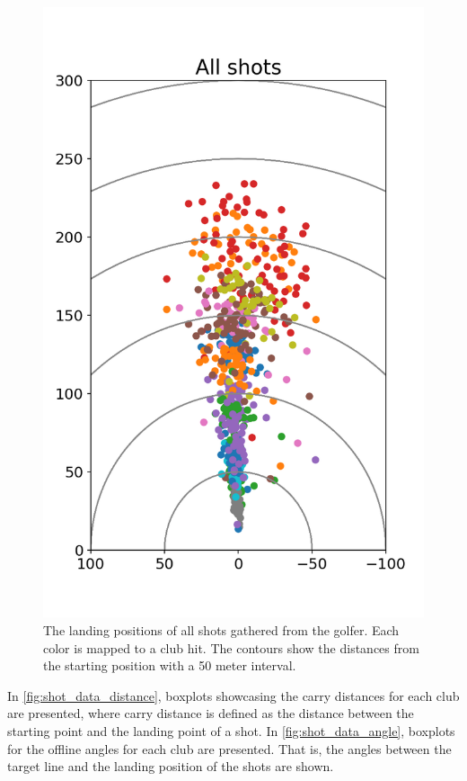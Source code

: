\documentclass{kththesis}
\begin{document}
\begin{figure}
    \centering
    \includegraphics[height=0.4\textheight]{Shots/all_shots.png}
    \caption{The landing positions of all shots gathered from the golfer. Each color is mapped to a club hit. The contours show the distances from the starting position with a 50 meter interval.}
    \label{fig:all_shots}
\end{figure}

In \autoref{fig:shot_data_distance}, boxplots showcasing the carry distances for each club are presented, where carry distance is defined as the distance between the starting point and the landing point of a shot. In \autoref{fig:shot_data_angle}, boxplots for the offline angles for each club are presented. That is, the angles between the target line and the landing position of the shots are shown.
\end{document}
